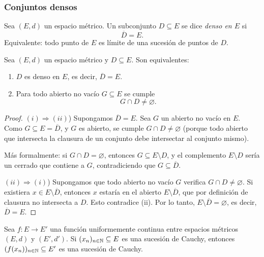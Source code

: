 \subsubsection{Conjuntos densos}

\begin{defi}
Sea $(E,d)$ un espacio métrico. Un subconjunto $D \subseteq E$ se dice
\emph{denso en $E$} si
\[
\overline{D} = E.
\]
Equivalente: todo punto de $E$ es límite de una sucesión de puntos de $D$.
\end{defi}

\begin{prop}
Sea $(E,d)$ un espacio métrico y $D \subseteq E$. Son equivalentes:
\begin{enumerate}[label=(\roman*)]
    \item $D$ es denso en $E$, es decir, $\overline{D} = E$.
    \item Para todo abierto no vacío $G \subseteq E$ se cumple
    \[
    G \cap D \neq \varnothing.
    \]
\end{enumerate}
\end{prop}

\begin{proof}
$(i) \Rightarrow (ii)$) Supongamos $\overline{D} = E$. Sea $G$ un abierto
no vacío en $E$. Como $G \subseteq E = \overline{D}$, y $G$ es abierto,
se cumple $G \cap D \neq \varnothing$ (porque todo abierto que intersecta
la clausura de un conjunto debe intersectar al conjunto mismo).

Más formalmente: si $G \cap D = \varnothing$, entonces $G \subseteq E\setminus D$,
y el complemento $E\setminus D$ sería un cerrado que contiene a $G$,
contradiciendo que $G \subseteq \overline{D}$.

\medskip

$(ii) \Rightarrow (i)$) Supongamos que todo abierto no vacío $G$ verifica
$G \cap D \neq \varnothing$. Si existiera $x \in E \setminus \overline{D}$,
entonces $x$ estaría en el abierto $E \setminus \overline{D}$, que por
definición de clausura no intersecta a $D$. Esto contradice (ii).
Por lo tanto, $E \setminus \overline{D} = \varnothing$, es decir,
$\overline{D} = E$.
\end{proof}

\begin{lema}
Sea $f : E \to E'$ una función uniformemente continua entre espacios
métricos $(E,d)$ y $(E',d')$. Si $(x_n)_{n\in\mathbb{N}} \subseteq E$ es una
sucesión de Cauchy, entonces $(f(x_n))_{n\in\mathbb{N}} \subseteq E'$ es una
sucesión de Cauchy.
\end{lema}

